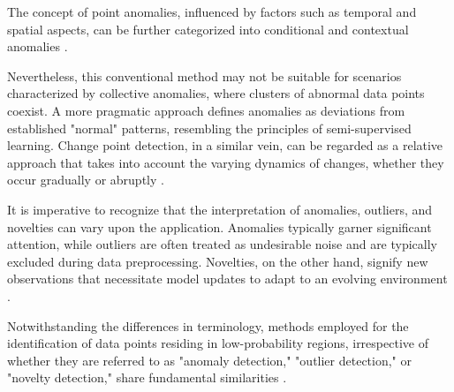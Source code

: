 The concept of point anomalies, influenced by factors such as temporal and spatial aspects, can be further categorized into conditional and contextual anomalies \citep{Ruff2021}.

Nevertheless, this conventional method may not be suitable for scenarios characterized by collective anomalies, where clusters of abnormal data points coexist. A more pragmatic approach defines anomalies as deviations from established "normal" patterns, resembling the principles of semi-supervised learning. Change point detection, in a similar vein, can be regarded as a relative approach that takes into account the varying dynamics of changes, whether they occur gradually or abruptly \citep{IGLESIASVAZQUEZ2023120994}.

It is imperative to recognize that the interpretation of anomalies, outliers, and novelties can vary upon the application. Anomalies typically garner significant attention, while outliers are often treated as undesirable noise and are typically excluded during data preprocessing. Novelties, on the other hand, signify new observations that necessitate model updates to adapt to an evolving environment \citep{Ruff2021}.

Notwithstanding the differences in terminology, methods employed for the identification of data points residing in low-probability regions, irrespective of whether they are referred to as "anomaly detection," "outlier detection," or "novelty detection," share fundamental similarities \citep{IGLESIASVAZQUEZ2023120994}.
